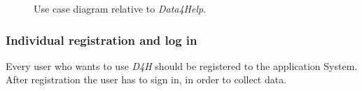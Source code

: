             \begin{figure}[H]
                \centering
                \caption{Use case diagram relative to \emph{Data4Help}.}
                \label{fig:D4H-Use-case-diagram}
            \end{figure}
        
        \subsubsection{Individual registration and log in}
            Every user who wants to use \emph{D4H} should be registered to the application System. After registration the user has to sign in, in order to collect data. \\


